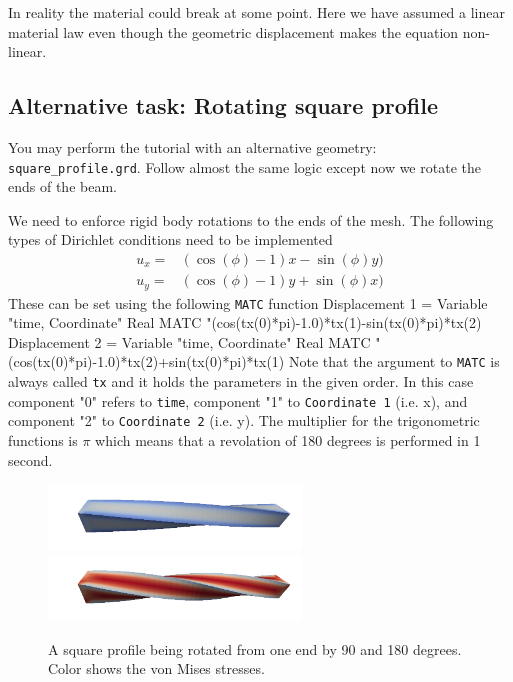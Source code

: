 In reality the material could break at some point. Here we have assumed a linear material law
even though the geometric displacement makes the equation non-linear. 


\subsection*{Alternative task: Rotating square profile}

You may perform the tutorial with an alternative geometry: \texttt{square\_profile.grd}.
Follow almost the same logic except now we rotate the ends of the beam.

We need to enforce rigid body rotations to the ends of the mesh. The following
types of Dirichlet conditions need to be implemented
\begin{equation}
  \begin{array}{ll}
    u_x = & ( \cos(\phi) - 1)x - \sin(\phi)y ) \\
    u_y = & ( \cos(\phi) - 1)y + \sin(\phi)x )     
  \end{array}
\end{equation}
These can be set using the following \texttt{MATC} function
\ttbegin
  Displacement 1 = Variable "time, Coordinate"
    Real MATC "(cos(tx(0)*pi)-1.0)*tx(1)-sin(tx(0)*pi)*tx(2)
  Displacement 2 = Variable "time, Coordinate"
    Real MATC "(cos(tx(0)*pi)-1.0)*tx(2)+sin(tx(0)*pi)*tx(1)
\ttend 
Note that the argument to \texttt{MATC} is always called \texttt{tx} and it holds the
parameters in the given order. In this case component "0" refers to \texttt{time}, component "1" to
\texttt{Coordinate 1} (i.e. x), and component "2" to \texttt{Coordinate 2} (i.e. y). 
The multiplier for the trigonometric functions is $\pi$ which means that a revolation of
180 degrees is performed in 1 second. 
 
\begin{figure}[h!]
\begin{center}
  \includegraphics[width=0.6\textwidth]{RotatingProfile50}
  \includegraphics[width=0.6\textwidth]{RotatingProfile100}
  \caption{A square profile being rotated from one end by 90 and 180 degrees. Color shows the von Mises stresses.}
  \label{fig:RotatingProfile}
\end{center}
\end{figure}



\vfill
\mbox{}
